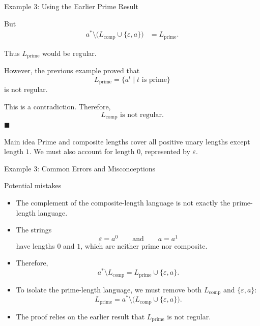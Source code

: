 \documentclass[10pt,aspectratio=169]{beamer}
\newcommand{\eps}{\varepsilon}
\begin{document}
\begin{frame}{Example 3: Using the Earlier Prime Result}

\small
But
\[
\begin{aligned}
a^*\setminus
\bigl(L_{\mathrm{comp}}\cup\{\eps,a\}\bigr)
&=
L_{\mathrm{prime}}.
\end{aligned}
\]

Thus \(L_{\mathrm{prime}}\) would be regular.

However, the previous example proved that
\[
L_{\mathrm{prime}}
=
\{a^t\mid t\text{ is prime}\}
\]
is not regular.

\vspace{0.5em}
This is a contradiction. Therefore,
\[
\boxed{L_{\mathrm{comp}}\text{ is not regular}.}
\]
\hfill\(\blacksquare\)

\vspace{0.5em}
\begin{block}{Main idea}
Prime and composite lengths cover all positive unary lengths except
length \(1\). We must also account for length \(0\), represented by
\(\eps\).
\end{block}

\end{frame}

\begin{frame}{Example 3: Common Errors and Misconceptions}

\small
\begin{alertblock}{Potential mistakes}
\begin{itemize}
    \item The complement of the composite-length language is not
    exactly the prime-length language.

    \item The strings
    \[
    \eps=a^0
    \qquad\text{and}\qquad
    a=a^1
    \]
    have lengths \(0\) and \(1\), which are neither prime nor composite.

    \item Therefore,
    \[
    a^*\setminus L_{\mathrm{comp}}
    =
    L_{\mathrm{prime}}\cup\{\eps,a\}.
    \]

    \item To isolate the prime-length language, we must remove both
    \(L_{\mathrm{comp}}\) and \(\{\eps,a\}\):
    \[
    L_{\mathrm{prime}}
    =
    a^*\setminus
    \bigl(L_{\mathrm{comp}}\cup\{\eps,a\}\bigr).
    \]

    \item The proof relies on the earlier result that
    \(L_{\mathrm{prime}}\) is not regular.
\end{itemize}
\end{alertblock}

\end{frame}
\end{document}
